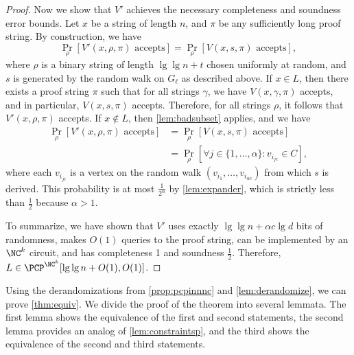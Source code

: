 \documentclass[]{article}
\begin{document}
\begin{proof}
  Now we show that $V'$ achieves the necessary completeness and soundness error bounds.
  Let $x$ be a string of length $n$, and $\pi$ be any sufficiently long proof string.
  By construction, we have
  \begin{equation*}
    \Pr_\rho[V'(x, \rho, \pi) \text{ accepts}] = \Pr_\rho[V(x, s, \pi) \text{ accepts}],
  \end{equation*}
  where $\rho$ is a binary string of length $\lg \lg n + t$ chosen uniformly at random, and $s$ is generated by the random walk on $G_\ell$ as described above.
  If $x \in L$, then there exists a proof string $\pi$ such that for all strings $\gamma$, we have $V(x, \gamma, \pi)$ accepts, and in particular, $V(x, s, \pi)$ accepts.
  Therefore, for all strings $\rho$, it follows that $V'(x, \rho, \pi)$ accepts.
  If $x \notin L$, then \autoref{lem:badsubset} applies, and we have
  \begin{align*}
    \Pr_\rho[V'(x, \rho, \pi) \text{ accepts}] & = \Pr_\rho[V(x, s, \pi) \text{ accepts}] \\
    & = \Pr_\rho[\forall j \in \{1, \dotsc, \alpha\} \colon v_{i_{jc}} \in C],
  \end{align*}
  where each $v_{i_{jc}}$ is a vertex on the random walk $(v_{i_1}, \dotsc, v_{i_{\alpha c}})$ from which $s$ is derived.
  This probability is at most $\frac{1}{2^\alpha}$ by \autoref{lem:expander}, which is strictly less than $\frac{1}{2}$ because $\alpha > 1$.

  To summarize, we have shown that $V'$ uses exactly $\lg \lg n + \alpha c \lg d$ bits of randomness, makes $O(1)$ queries to the proof string, can be implemented by an $\NC^k$ circuit, and has completeness 1 and soundness $\frac{1}{2}$.
  Therefore, $L \in \PCP^{\NC^k}[\lg \lg n + O(1), O(1)]$.
\end{proof}

Using the derandomizations from \autoref{prop:pcpinnnc} and \autoref{lem:derandomize}, we can prove \autoref{thm:equiv}.
We divide the proof of the theorem into several lemmata.
The first lemma shows the equivalence of the first and second statements, the second lemma provides an \NC{} analog of \autoref{lem:constraintsp}, and the third shows the equivalence of the second and third statements.
\end{document}
